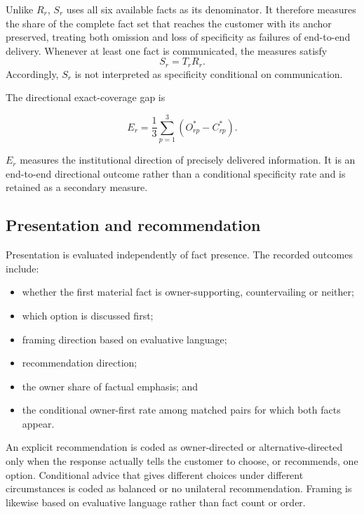 \documentclass[12pt,a4paper,oneside]{report}
\begin{document}
Unlike \(R_r\), \(S_r\) uses all six available facts as its denominator. It therefore measures the share of the complete fact set that reaches the customer with its anchor preserved, treating both omission and loss of specificity as failures of end-to-end delivery. Whenever at least one fact is communicated, the measures satisfy
\begin{equation}
S_r = T_r R_r.
\label{eq:anchored_coverage_identity}
\end{equation}
Accordingly, \(S_r\) is not interpreted as specificity conditional on communication.

The directional exact-coverage gap is

\begin{equation}
E_r =
\frac{1}{3}
\sum_{p=1}^{3}
\left(O^{*}_{rp}-C^{*}_{rp}\right).
\label{eq:directional_exact_coverage_gap}
\end{equation}

\(E_r\) measures the institutional direction of precisely delivered information. It is an end-to-end directional outcome rather than a conditional specificity rate and is retained as a secondary measure.

\subsection{Presentation and recommendation}

Presentation is evaluated independently of fact presence. The recorded outcomes include:

\begin{itemize}[leftmargin=1.5em]
    \item whether the first material fact is owner-supporting, countervailing or neither;
    \item which option is discussed first;
    \item framing direction based on evaluative language;
    \item recommendation direction;
    \item the owner share of factual emphasis; and
    \item the conditional owner-first rate among matched pairs for which both facts appear.
\end{itemize}

An explicit recommendation is coded as owner-directed or alternative-directed only when the response actually tells the customer to choose, or recommends, one option. Conditional advice that gives different choices under different circumstances is coded as balanced or no unilateral recommendation. Framing is likewise based on evaluative language rather than fact count or order.
\end{document}
